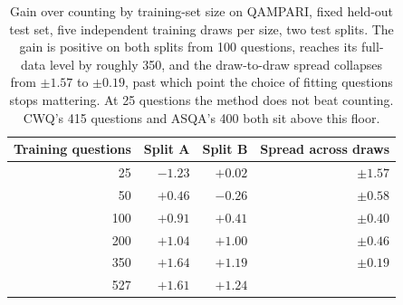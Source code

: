\documentclass[11pt]{article}
\begin{document}
\begin{table}[t]
  \caption{Gain over counting by training-set size on QAMPARI, fixed held-out test set, five independent training draws per size, two test splits. The gain is positive on both splits from 100 questions, reaches its full-data level by roughly 350, and the draw-to-draw spread collapses from $\pm 1.57$ to $\pm 0.19$, past which point the choice of fitting questions stops mattering. At 25 questions the method does not beat counting. CWQ's 415 questions and ASQA's 400 both sit above this floor.}
  \label{tab:curve}
  \centering
  \begin{tabular}{rrrr}
    \toprule
    Training questions & Split A & Split B & Spread across draws \\
    \midrule
     25 & $-1.23$ & $+0.02$ & $\pm 1.57$ \\
     50 & $+0.46$ & $-0.26$ & $\pm 0.58$ \\
    100 & $+0.91$ & $+0.41$ & $\pm 0.40$ \\
    200 & $+1.04$ & $+1.00$ & $\pm 0.46$ \\
    350 & $+1.64$ & $+1.19$ & $\pm 0.19$ \\
    527 & $+1.61$ & $+1.24$ & \\
    \bottomrule
  \end{tabular}
\end{table}


\newpage

\clearpage
\end{document}
